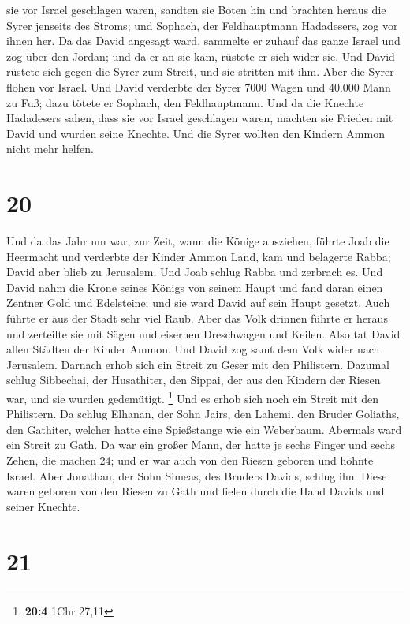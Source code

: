 sie vor Israel geschlagen waren, sandten sie Boten hin und brachten
heraus die Syrer jenseits des Stroms; und Sophach, der Feldhauptmann
Hadadesers, zog vor ihnen her.  Da das David angesagt
ward, sammelte er zuhauf das ganze Israel und zog über den Jordan; und
da er an sie kam, rüstete er sich wider sie. Und David rüstete sich
gegen die Syrer zum Streit, und sie stritten mit ihm. 
Aber die Syrer flohen vor Israel. Und David verderbte der Syrer 7000
Wagen und 40.000 Mann zu Fuß; dazu tötete er Sophach, den Feldhauptmann.
 Und da die Knechte Hadadesers sahen, dass sie vor Israel
geschlagen waren, machten sie Frieden mit David und wurden seine
Knechte. Und die Syrer wollten den Kindern Ammon nicht mehr helfen.

\hypertarget{section-19}{%
\section{20}\label{section-19}}

 Und da das Jahr um war, zur Zeit, wann die Könige
ausziehen, führte Joab die Heermacht und verderbte der Kinder Ammon
Land, kam und belagerte Rabba; David aber blieb zu Jerusalem. Und Joab
schlug Rabba und zerbrach es.  Und David nahm die Krone
seines Königs von seinem Haupt und fand daran einen Zentner Gold und
Edelsteine; und sie ward David auf sein Haupt gesetzt. Auch führte er
aus der Stadt sehr viel Raub.  Aber das Volk drinnen
führte er heraus und zerteilte sie mit Sägen und eisernen Dreschwagen
und Keilen. Also tat David allen Städten der Kinder Ammon. Und David zog
samt dem Volk wider nach Jerusalem.  Darnach erhob sich
ein Streit zu Geser mit den Philistern. Dazumal schlug Sibbechai, der
Husathiter, den Sippai, der aus den Kindern der Riesen war, und sie
wurden gedemütigt. \footnote{\textbf{20:4} 1Chr 27,11} 
Und es erhob sich noch ein Streit mit den Philistern. Da schlug Elhanan,
der Sohn Jairs, den Lahemi, den Bruder Goliaths, den Gathiter, welcher
hatte eine Spießstange wie ein Weberbaum.  Abermals ward
ein Streit zu Gath. Da war ein großer Mann, der hatte je sechs Finger
und sechs Zehen, die machen 24; und er war auch von den Riesen geboren
 und höhnte Israel. Aber Jonathan, der Sohn Simeas, des
Bruders Davids, schlug ihn.  Diese waren geboren von den
Riesen zu Gath und fielen durch die Hand Davids und seiner Knechte.

\hypertarget{section-20}{%
\section{21}\label{section-20}}

